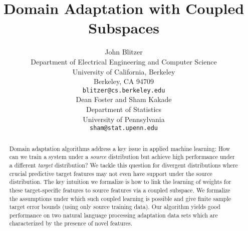 \documentclass{article}
\title{Domain Adaptation with Coupled Subspaces}
\author{
John Blitzer \\
Department of Electrical Engineering and Computer Science\\
University of California, Berkeley\\
Berkeley, CA 94709 \\
\texttt{blitzer@cs.berkeley.edu}\\
\And
Dean Foster and Sham Kakade \\
Department of Statistics \\
University of Pennsylvania \\
\texttt{sham@stat.upenn.edu} \\
}
\begin{document}
\maketitle

\begin{abstract}
  Domain adaptation algorithms address a key issue in applied machine
  learning: How can we train a system under a \emph{source}
  distribution but achieve high performance under a different
  \emph{target} distribution?  We tackle this question for divergent
  distributions where crucial predictive target features may not even
  have support under the source distribution.  The key intuition we
  formalize is how to link the learning of weights for these
  target-specific features to source features via a coupled subspace.
  We formalize the assumptions under which such coupled learning is
  possible and give finite sample target error bounds (using only
  source training data).  Our algorithm yields good performance on two
  natural language processing adaptation data sets which are
  characterized by the presence of novel features.
\end{abstract}















\newpage
\appendix

\end{document}
